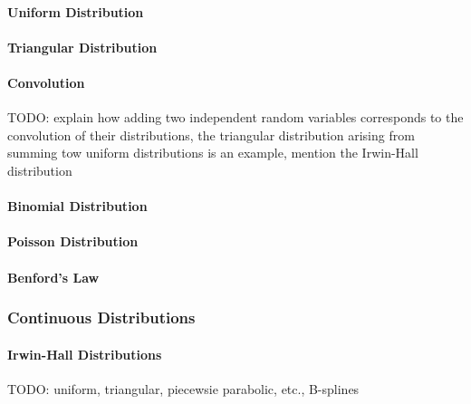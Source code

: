 \paragraph{Uniform Distribution}

\paragraph{Triangular Distribution}

\paragraph{Convolution} TODO: explain how adding two independent random variables corresponds to the convolution of their distributions, the triangular distribution arising from summing tow uniform distributions is an example, mention the Irwin-Hall distribution



\paragraph{Binomial Distribution}


\paragraph{Poisson Distribution}


\paragraph{Benford's Law}



\subsubsection{Continuous Distributions}

\paragraph{Irwin-Hall Distributions} TODO: uniform, triangular, piecewsie parabolic, etc., B-splines

